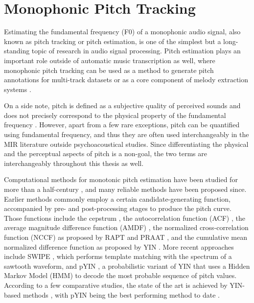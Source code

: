 \section{Monophonic Pitch Tracking}\label{sec:monophonic}

Estimating the fundamental frequency (F0) of a monophonic audio signal, also known as pitch tracking or pitch estimation, is one of the simplest but a long-standing topic of research in audio signal processing.
Pitch estimation plays an important role outside of automatic music transcription as well, where monophonic pitch tracking can be used as a method to generate pitch annotations for multi-track datasets \cite{bittner2014medleydb} or as a core component of melody extraction systems \cite{bosch2014melody, mauch2015computer}.

On a side note, pitch is defined as a subjective quality of perceived sounds and does not precisely correspond to the physical property of the fundamental frequency \cite{hartmann1997signals}.
However, apart from a few rare exceptions, pitch can be quantified using fundamental frequency, and thus they are often used interchangeably in the MIR literature outside psychoacoustical studies. 
Since differentiating the physical and the perceptual aspects of pitch is a non-goal, the two terms are interchangeably throughout this thesis as well.

Computational methods for monotonic pitch estimation have been studied for more than a half-century \cite{noll1967cepstrum}, and many reliable methods have been proposed since.
Earlier methods commonly employ a certain candidate-generating function, accompanied by pre- and post-processing stages to produce the pitch curve.
Those functions include the cepstrum \cite{noll1967cepstrum}, the autocorrelation function (ACF) \cite{dubnowski1976acf}, the average magnitude difference function (AMDF) \cite{ross1974amdf}, the normalized cross-correlation function (NCCF) as proposed by RAPT \cite{talkin1995rapt} and PRAAT \cite{boersma1993praat}, and the cumulative mean normalized difference function as proposed by YIN \cite{decheveigne2002yin}. More recent approaches include SWIPE \cite{camacho2008swipe}, which performs template matching with the spectrum of a sawtooth waveform, and 
pYIN \cite{mauch2014pyin}, a probabilistic variant of YIN that uses a Hidden Markov Model (HMM) to decode the most probable sequence of pitch values.
According to a few comparative studies, the state of the art is achieved by YIN-based methods \cite{von2010comparison, babacan2013comparative}, with pYIN being the best performing method to date \cite{mauch2014pyin}.

